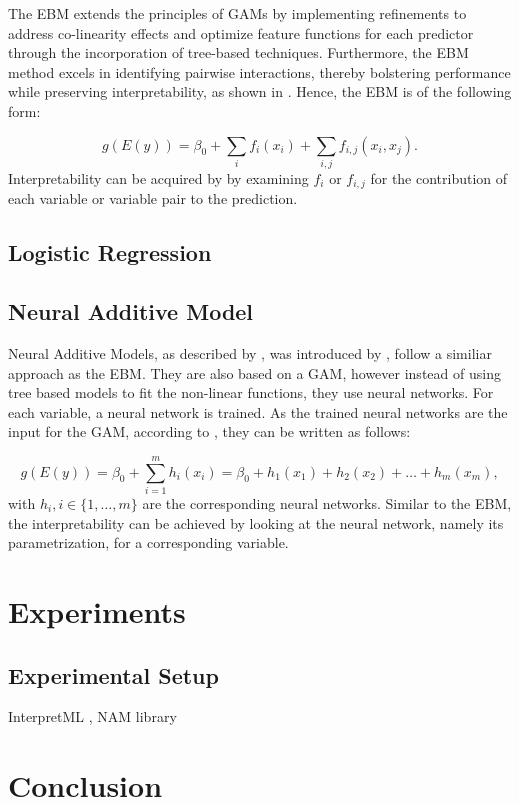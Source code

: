 \documentclass{article}
\begin{document}
The EBM extends the principles of GAMs by implementing refinements to address co-linearity effects and optimize feature functions for each predictor through the incorporation of tree-based techniques. Furthermore, the EBM method excels in identifying pairwise interactions, thereby bolstering performance while preserving interpretability, as shown in \cite{lou2013accurate}. Hence, the EBM is of the following form:

\begin{equation}
g(E(y)) = \beta_0 + \sum_{i} f_i(x_i) + \sum_{i, j} f_{i,j}(x_i, x_j).
\end{equation}
Interpretability can be acquired by by examining $f_i$ or $f_{i, j}$ for the contribution of each variable or variable pair to the prediction. \cite{nazemi2022interpretable}
\subsection{Logistic Regression}
\subsection{Neural Additive Model}
Neural Additive Models, as described by \cite{nazemi2022interpretable}, was introduced by \cite{NAM-Library1}, follow a similiar approach as the EBM. They are also based on a GAM, however instead of using tree based models to fit the non-linear functions, they use neural networks. For each variable, a neural network is trained.
As the trained neural networks are the input for the GAM, according to \cite{nazemi2022interpretable}, they can be written as follows:

\begin{equation}
g(E(y)) = \beta_0 + \sum_{i=1}^{m} h_i(x_i) = \beta_0 + h_1(x_1) + h_2(x_2) + \dots + h_m(x_m),
\end{equation}
with $h_i, i \in \{1,\dots, m\}$ are the corresponding neural networks.
Similar to the EBM, the interpretability can be achieved by looking at the neural network, namely its parametrization, for a corresponding variable. \cite{nazemi2022interpretable}
\section{Experiments}
\subsection{Experimental Setup}
InterpretML \cite{InterpretML}, NAM library \cite{NAM-Library1, NAM-Library2}



\section{Conclusion}



\end{document}
